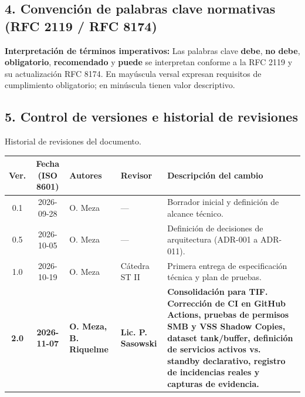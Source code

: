 \documentclass[10pt,a4paper]{article}
\begin{document}
\subsection*{4. Convención de palabras clave normativas (RFC 2119 / RFC 8174)}
\begin{normativabox}{}
\textbf{Interpretación de términos imperativos:} Las palabras clave \textbf{debe}, \textbf{no debe}, \textbf{obligatorio}, \textbf{recomendado} y \textbf{puede} se interpretan conforme a la RFC 2119 y su actualización RFC 8174. En mayúscula versal expresan requisitos de cumplimiento obligatorio; en minúscula tienen valor descriptivo.
\end{normativabox}

\subsection*{5. Control de versiones e historial de revisiones}
Historial de revisiones del documento.

\begin{table}[htbp]
\centering
\small
\begin{tabular}{|c|c|p{2.6cm}|p{2.5cm}|p{6.1cm}|}
\hline
\textbf{\textsf{Ver.}} & \textbf{\textsf{Fecha (ISO 8601)}} & \textbf{\textsf{Autores}} & \textbf{\textsf{Revisor}} & \textbf{\textsf{Descripción del cambio}} \\
\hline
0.1 & 2026-09-28 & O. Meza & — & Borrador inicial y definición de alcance técnico. \\
\hline
0.5 & 2026-10-05 & O. Meza & — & Definición de decisiones de arquitectura (ADR-001 a ADR-011). \\
\hline
1.0 & 2026-10-19 & O. Meza & Cátedra ST II & Primera entrega de especificación técnica y plan de pruebas. \\
\hline
\textbf{2.0} & \textbf{2026-11-07} & \textbf{O. Meza, B. Riquelme} & \textbf{Lic. P. Sasowski} & \textbf{Consolidación para TIF. Corrección de CI en GitHub Actions, pruebas de permisos SMB y VSS Shadow Copies, dataset tank/buffer, definición de servicios activos vs. standby declarativo, registro de incidencias reales y capturas de evidencia.} \\
\hline
\end{tabular}
\end{table}

\newpage
\end{document}
